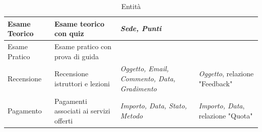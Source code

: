 \documentclass[10pt,twoside]{article}
\begin{document}
{\begin{table}[H]
\begin{tabularx}{\textwidth}{|>{\centering\arraybackslash}p{2.6cm}|>{\centering\arraybackslash}X|>{\centering\arraybackslash}p{4.85cm}|>{\centering\arraybackslash}X|}
            \hline
            \rowcolor{white!40}
            Esame Teorico & Esame teorico con quiz & \textit{Sede, Punti} & \\
            \hline
            \rowcolor{white!40}
            Esame Pratico & Esame pratico con prova di guida & & \\
            \hline
            \rowcolor{white!40}
            Recensione & Recensione istruttori e lezioni & \textit{Oggetto, Email, Commento, Data, Gradimento} & \textit{Oggetto}, relazione "Feedback"\\
            \hline
            \rowcolor{white!40}
            Pagamento & Pagamenti associati ai servizi offerti & \textit{Importo, Data, Stato, Metodo} & \textit{Importo, Data}, relazione "Quota"\\
            \hline
        \end{tabularx}
        \caption{Entità}
        \label{fig:tabellaEntita}
    \end{table}

    \newpage

}
\end{document}
